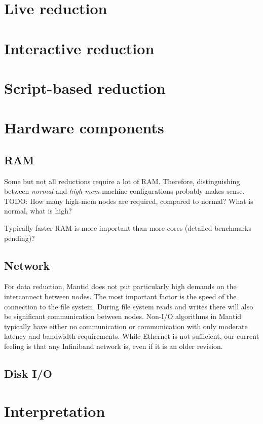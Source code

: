 \documentclass[a4paper,english,numbers=noenddot,bibliography=totoc,chapterprefix=on,DIV=12]{scrartcl}
\begin{document}
\section{Live reduction}
\section{Interactive reduction}
\section{Script-based reduction}



\section{Hardware components}

\subsection{RAM}

Some but not all reductions require a lot of RAM.
Therefore, distinguishing between \emph{normal} and \emph{high-mem} machine configurations probably makes sense.
TODO: How many high-mem nodes are required, compared to normal? What is normal, what is high?

Typically faster RAM is more important than more cores (detailed benchmarks pending)?

\subsection{Network}

For data reduction, Mantid does not put particularly high demands on the interconnect between nodes.
The most important factor is the speed of the connection to the file system.
During file system reads and writes there will also be significant communication between nodes.
Non-I/O algorithms in Mantid typically have either no communication or communication with only moderate latency and bandwidth requirements.
While Ethernet is not sufficient, our current feeling is that any Infiniband network is, even if it is an older revision.

\subsection{Disk I/O}



\section{Interpretation}
\end{document}
